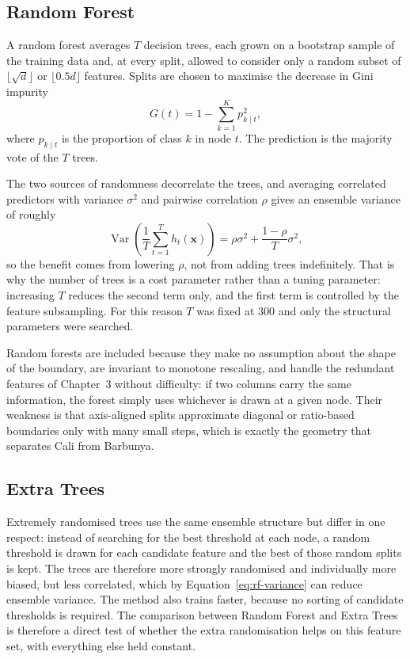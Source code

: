 \subsection{Random Forest}

A random forest \cite{breiman2001} averages $T$ decision trees, each grown on a bootstrap sample of
the training data and, at every split, allowed to consider only a random subset of
$\lfloor\sqrt{d}\rfloor$ or $\lfloor 0.5d\rfloor$ features. Splits are chosen to
maximise the decrease in Gini impurity
\begin{equation}
  G(t) = 1 - \sum_{k=1}^{K} p_{k\mid t}^{2},
  \label{eq:gini}
\end{equation}
where $p_{k\mid t}$ is the proportion of class $k$ in node $t$. The prediction is
the majority vote of the $T$ trees.

The two sources of randomness decorrelate the trees, and averaging correlated
predictors with variance $\sigma^2$ and pairwise correlation $\rho$ gives an
ensemble variance of roughly
\begin{equation}
  \operatorname{Var}\!\left(\frac{1}{T}\sum_{t=1}^{T} h_t(\mathbf{x})\right)
  = \rho\sigma^{2} + \frac{1-\rho}{T}\sigma^{2},
  \label{eq:rf-variance}
\end{equation}
so the benefit comes from lowering $\rho$, not from adding trees indefinitely.
That is why the number of trees is a cost parameter rather than a tuning
parameter: increasing $T$ reduces the second term only, and the first term is
controlled by the feature subsampling. For this reason $T$ was fixed at 300 and
only the structural parameters were searched.

Random forests are included because they make no assumption about the shape of the
boundary, are invariant to monotone rescaling, and handle the redundant features
of Chapter~3 without difficulty: if two columns carry the same information, the
forest simply uses whichever is drawn at a given node. Their weakness is that
axis-aligned splits approximate diagonal or ratio-based boundaries only with many
small steps, which is exactly the geometry that separates Cali from Barbunya.

\subsection{Extra Trees}

Extremely randomised trees \cite{geurts2006} use the same ensemble structure but differ in one
respect: instead of searching for the best threshold at each node, a random
threshold is drawn for each candidate feature and the best of those random splits
is kept. The trees are therefore more strongly randomised and individually more
biased, but less correlated, which by Equation~\ref{eq:rf-variance} can reduce
ensemble variance. The method also trains faster, because no sorting of candidate
thresholds is required. The comparison between Random Forest and Extra Trees is
therefore a direct test of whether the extra randomisation helps on this feature
set, with everything else held constant.

